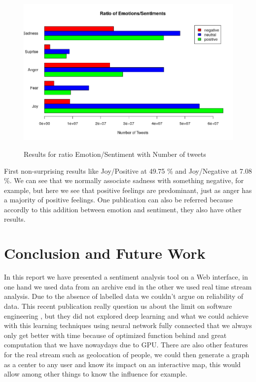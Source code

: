 \documentclass{acmtog} %
\begin{document}
\begin{figure}[h!]
{\includegraphics[width=\linewidth]{final_plot_contradiction_analysis.png}}
\caption{Results for ratio Emotion/Sentiment with Number of tweets}
  \label{fig:contradiction_barplot}
\end{figure}

First non-surprising results like Joy/Positive at 49.75 \% and Joy/Negative at 7.08 \%.
We can see that we normally associate sadness with something negative, for example, but here we see that positive feelings are predominant, just as anger has a majority of positive feelings. One publication can also be referred \cite{Alm05}  because accordly to this addition between emotion and sentiment, they also have other results.


\section{Conclusion and Future Work}
\label{sec:conclusion}

In this report we have presented a sentiment analysis tool on a Web interface, in one hand we used data from an archive end in the other we used real time stream analysis. Due to the absence of labelled data we couldn't argue on reliability of data.  This recent publication really question us about the limit on software engineering \cite{Lin18}, but they did not explored deep learning \cite{Meisheri17} and what we could achieve with this learning techniques using neural network fully connected that we always only get better with time because of optimized function behind and great computation that we have nowaydays due to GPU. 
There are also other features for the real stream such as geolocation of people, we could then generate a graph as a center to any user and know its impact on an interactive map, this would allow among other things to know the influence for example.
\end{document}
